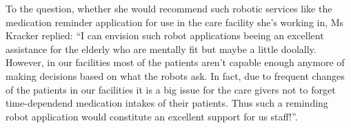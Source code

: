 To the question, whether she would recommend such robotic services like the medication reminder application for use in the care facility she's working in, Ms Kracker replied: ``I can envision such robot applications beeing an excellent assistance for the elderly who are mentally fit but maybe a little doolally. However, in our facilities most of the patients aren't capable enough anymore of making decisions based on what the robots ask. In fact, due to frequent changes of the patients in our facilities it is a big issue for the care givers not to forget time-dependend medication intakes of their patients. Thus such a reminding robot application would constitute an excellent support for us staff!''.